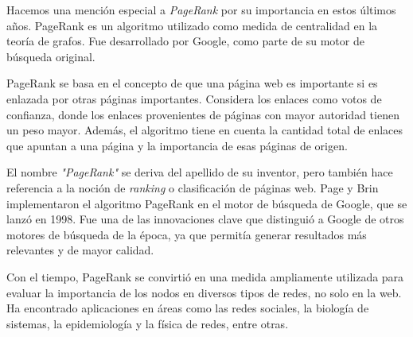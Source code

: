 Hacemos una mención especial a \textit{PageRank} por su importancia en estos últimos años. PageRank es un algoritmo utilizado como medida de
centralidad en la teoría de grafos. Fue desarrollado por Google, como parte de su motor de búsqueda
original.

PageRank se basa en el concepto de que una página web es importante si es enlazada por otras
páginas importantes. Considera los enlaces como votos de confianza, donde los enlaces provenientes
de páginas con mayor autoridad tienen un peso mayor. Además, el algoritmo tiene en cuenta la
cantidad total de enlaces que apuntan a una página y la importancia de esas páginas de origen.

El nombre \textit{"PageRank"} se deriva del apellido de su inventor, pero también hace referencia
a la noción de \textit{ranking} o clasificación de páginas web. Page y Brin implementaron el
algoritmo PageRank en el motor de búsqueda de Google, que se lanzó en 1998. Fue una de
las innovaciones clave que distinguió a Google de otros motores de búsqueda de la época, ya que
permitía generar resultados más relevantes y de mayor calidad\cite{Pageetal98}.

Con el tiempo, PageRank se convirtió en una medida ampliamente utilizada para evaluar la importancia
de los nodos en diversos tipos de redes, no solo en la web. Ha encontrado aplicaciones en áreas como
las redes sociales, la biología de sistemas, la epidemiología y la física de redes, entre otras.

